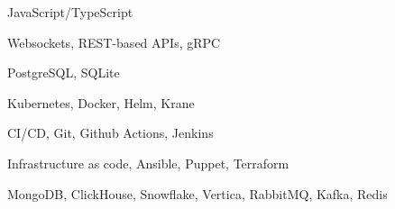 \item JavaScript/TypeScript
\item Websockets, REST-based APIs, gRPC
\item PostgreSQL, SQLite
\item Kubernetes, Docker, Helm, Krane
\item CI/CD, Git, Github Actions, Jenkins
\item Infrastructure as code, Ansible, Puppet, Terraform

MongoDB, ClickHouse, Snowflake, Vertica, RabbitMQ, Kafka,
  Redis
